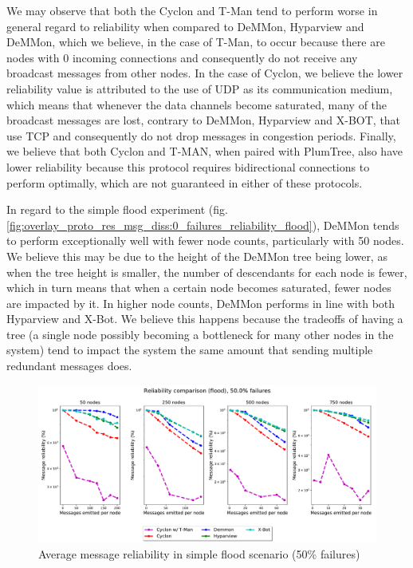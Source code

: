 We may observe that both the Cyclon and T-Man tend to perform worse in general regard to reliability when compared to DeMMon, Hyparview and DeMMon, which we believe, in the case of T-Man, to occur because there are nodes with 0 incoming connections and consequently do not receive any broadcast messages from other nodes. In the case of Cyclon, we believe the lower reliability value is attributed to the use of UDP as its communication medium, which means that whenever the data channels become saturated, many of the broadcast messages are lost, contrary to DeMMon, Hyparview and X-BOT, that use TCP and consequently do not drop messages in congestion periods. Finally, we believe that both Cyclon and T-MAN, when paired with PlumTree, also have lower reliability because this protocol requires bidirectional connections to perform optimally, which are not guaranteed in either of these protocols. 

In regard to the simple flood experiment (fig. \ref{fig:overlay_proto_res_msg_diss:0_failures_reliability_flood}), DeMMon tends to perform exceptionally well with fewer node counts, particularly with 50 nodes. We believe this may be due to the height of the DeMMon tree being lower, as when the tree height is smaller, the number of descendants for each node is fewer, which in turn means that when a certain node becomes saturated, fewer nodes are impacted by it. In higher node counts, DeMMon performs in line with both Hyparview and X-Bot. We believe this happens because the tradeoffs of having a tree (a single node possibly becoming a bottleneck for many other nodes in the system) tend to impact the system the same amount that sending multiple redundant messages does. 

\begin{figure}[htbp]
    \centering
    \includegraphics[width=\linewidth]{Chapters/evaluation/figures/flood/flood_50.0_failures_reliability.pdf}
    \caption{Average message reliability in simple flood scenario (50\% failures)}
    \label{fig:overlay_proto_res_msg_diss:50_failures_reliability_flood}
\end{figure}

